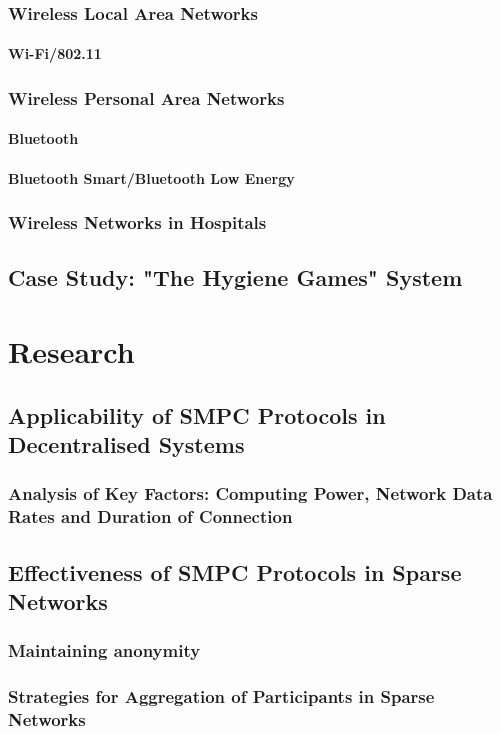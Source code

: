 	\subsection*{Wireless Local Area Networks}
	\subsubsection*{Wi-Fi/802.11}
	\subsection*{Wireless Personal Area Networks}
	\subsubsection*{Bluetooth}
	\subsubsection*{Bluetooth Smart/Bluetooth Low Energy}
	\subsection*{Wireless Networks in Hospitals}
	\section{Case Study: "The Hygiene Games" System}

\chapter{Research}
	\section{Applicability of SMPC Protocols in Decentralised Systems}
	
	\subsection*{Analysis of Key Factors: Computing Power, Network Data Rates and Duration of Connection}
	\section{Effectiveness of SMPC Protocols in Sparse Networks}
	\subsection*{Maintaining anonymity}
	\subsection*{Strategies for Aggregation of Participants in Sparse Networks}
